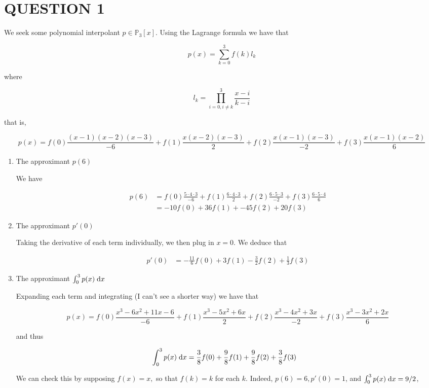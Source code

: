 \documentclass[a4paper]{article}
\begin{document}
	
\maketitle

\section{QUESTION 1}

We seek some polynomial interpolant $ p \in \mathbb{P}_{3}[x] $. Using the Lagrange formula we have that

\[ p(x) = \sum_{k=0}^{3} f(k) l_{k}  \]

where 

\[ l_{k} = \prod_{i=0, i \neq k}^{3} \frac{x - i}{k - i}  \] 

that is,

\[ p(x) = f(0) \frac{(x-1)(x-2)(x-3)}{-6} + f(1) \frac{x(x-2)(x-3)}{2} + f(2) \frac{x(x-1)(x-3)}{-2} + f(3) \frac{x(x-1)(x-2)}{6}  \]

\begin{enumerate}
	\item The approximant $ p(6) $
	
	We have
	
	\begin{align*}
	p(6) & = f(0) \frac{5 \cdot 4 \cdot 3}{-6} + f(1) \frac{6\cdot 4 \cdot 3}{2} + f(2) \frac{6 \cdot 5 \cdot 3}{-2} + f(3) \frac{6 \cdot 5 \cdot 4}{6} \\
	& = -10 f(0) + 36 f(1)+ -45 f(2) + 20 f(3) 
	\end{align*}
	
	\item The approximant $ p'(0) $
	
	Taking the derivative of each term individually, we then plug in $ x=0 $. We deduce that
	
	\begin{align*}
	p'(0) & = -\frac{11}{6} f(0) + 3f(1) - \frac{3}{2}  f(2) + \frac{1}{3} f(3) 
	\end{align*}
	
	\item The approximant $ \int_{0}^{3} p(x) \; \mathrm{d} x $
	
	Expanding each term and integrating (I can't see a shorter way) we have that

	\[ p(x) = f(0) \frac{x^{3} - 6x^{2} + 11 x - 6}{-6} + f(1) \frac{x^{3}  - 5 x^{2} + 6x}{2} + f(2) \frac{x^{3} - 4 x^{2} + 3x}{-2} + f(3) \frac{x^{3} - 3x^{2} + 2x}{6}  \]
	
	and thus
	
	\begin{align*}
	\int_{0}^{3} p(x) \; \mathrm{d} x & = \frac{3}{8} f(0) + \frac{9}{8} f(1) +  \frac{9}{8} f(2) + \frac{3}{8} f(3)  
	\end{align*}
	
	We can check this by supposing $ f(x) = x, $ so that $ f(k)  = k  $ for each $ k $. Indeed, $ p(6) = 6, p'(0) = 1 $, and $ \int_{0}^{3} p(x) \; \mathrm{d} x =  9/2 $, 
	
\end{enumerate}
\end{document}

